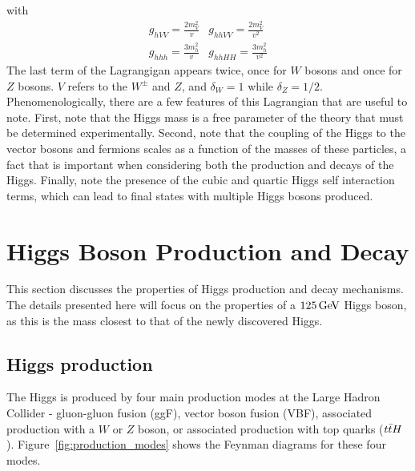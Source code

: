 %
with 
%
\begin{equation}
\begin{array}{cc}
g_{hVV} = \frac{2m_V^2}{v} & g_{hhVV} = \frac{2m_V^2}{v^2} \\ 
g_{hhh} = \frac{3m_h^2}{v} & g_{hhHH} = \frac{3m_h^2}{v^2}
\end{array}
\end{equation}
%
The last term of the Lagrangigan appears twice, once for $W$ bosons and once for $Z$ bosons. $V$ refers to the $W^{\pm}$ and $Z$, and $\delta_{W} = 1$ while $\delta_Z = 1/2$. Phenomenologically, there are a few features of this Lagrangian that are useful to note. First, note that the Higgs mass is a free parameter of the theory that must be determined experimentally. Second, note that the coupling of the Higgs to the vector bosons and fermions scales as a function of the masses of these particles, a fact that is important when considering both the production and decays of the Higgs. Finally, note the presence of the cubic and quartic Higgs self interaction terms, which can lead to final states with multiple Higgs bosons produced. 


\section{Higgs Boson Production and Decay}

This section discusses the properties of Higgs production and decay mechanisms. The details presented here will focus on the properties of a $125 \GeV$ Higgs boson, as this is the mass closest to that of the newly discovered Higgs. 

\subsection{Higgs production}

The Higgs is produced by four main production modes at the Large Hadron Collider - gluon-gluon fusion (ggF), vector boson fusion (VBF), associated production with a $W$ or $Z$ boson, or associated production with top quarks ($t\bar{t} H$). Figure~\ref{fig:production_modes} shows the Feynman diagrams for these four modes. 


